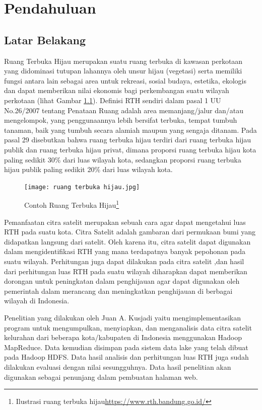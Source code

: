 \chapter{Pendahuluan}
\label{chap:intro}

\section{Latar Belakang}
\label{sec:label}

Ruang Terbuka Hijau merupakan suatu ruang terbuka di kawasan perkotaan yang didominasi tutupan lahannya oleh unsur hijau (vegetasi) serta memiliki fungsi antara lain sebagai area untuk rekreasi, sosial budaya, estetika, ekologis dan dapat memberikan nilai ekonomis bagi perkembangan suatu wilayah perkotaan (lihat Gambar \ref{fig:rth}). Definisi RTH sendiri dalam pasal 1 UU No.26/2007 tentang Penataan Ruang adalah area memanjang/jalur dan/atau mengelompok, yang penggunaannya lebih bersifat terbuka, tempat tumbuh tanaman, baik yang tumbuh secara alamiah maupun yang sengaja ditanam. Pada pasal 29 disebutkan bahwa ruang terbuka hijau terdiri dari ruang terbuka hijau publik dan ruang terbuka hijau privat, dimana proporsi ruang terbuka hijau kota paling sedikit 30\% dari luas wilayah kota, sedangkan proporsi ruang terbuka hijau publik paling sedikit 20\% dari luas wilayah kota. %

\begin{figure}[h]
	\centering
	\texttt{[image: ruang terbuka hijau.jpg]}
	\caption[RTH]{Contoh Ruang Terbuka Hijau\footnote{Ilustrasi ruang terbuka hijau\url{https://www.rth.bandung.go.id/}}}
	\label{fig:rth}
\end{figure}


Pemanfaatan citra satelit merupakan sebuah cara agar dapat mengetahui luas RTH pada suatu kota. Citra Satelit adalah gambaran dari permukaan bumi yang didapatkan langsung dari satelit. Oleh karena itu, citra satelit dapat digunakan dalam mengidentifikasi RTH yang mana terdapatnya banyak pepohonan pada suatu wilayah. Perhitungan juga dapat dilakukan pada citra satelit ,dan hasil dari perhitungan luas RTH pada suatu wilayah diharapkan dapat memberikan dorongan untuk peningkatan dalam penghijauan agar dapat digunakan oleh pemerintah dalam merancang dan meningkatkan penghijauan di berbagai wilayah di Indonesia.

Penelitian yang dilakukan oleh Juan A. Kusjadi yaitu mengimplementasikan program untuk mengumpulkan, menyiapkan, dan menganalisis data
citra satelit kelurahan dari beberapa kota/kabupaten di Indonesia menggunakan Hadoop MapReduce. Data kemudian disimpan pada sistem data lake yang telah dibuat pada Hadoop HDFS. Data hasil analisis dan perhitungan luas RTH juga sudah dilakukan evaluasi dengan nilai sesungguhnya\cite{juan:22:pengumpulan}. Data hasil penelitian akan digunakan sebagai penunjang dalam pembuatan halaman web. 

